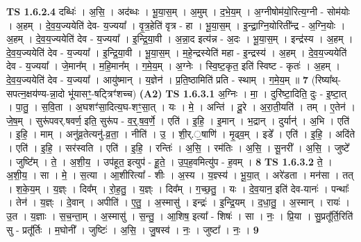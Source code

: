 \documentclass[17pt]{extarticle}
\begin{document}
                  \newline
                                \textbf{ TS 1.6.2.4} \newline
                  दब्धिः॑ । अ॒सि॒ । अद॑ब्धः । भू॒या॒स॒म् । अ॒मुम् । द॒भे॒य॒म् । अ॒ग्नीषोम॑यो॒रित्य॒ग्नी - सोम॑योः । अ॒हम् । दे॒व॒य॒ज्ययेति॑ देव- य॒ज्यया᳚ । वृ॒त्र॒हेति॑ वृत्र - हा । भू॒या॒स॒म् । इ॒न्द्रा॒ग्नि॒योरिती᳚न्द्र - अ॒ग्नि॒योः । अ॒हम् । दे॒व॒य॒ज्ययेति॑ देव - य॒ज्यया᳚ । इ॒न्द्रि॒या॒वी । अ॒न्ना॒द इत्य॑न्न - अ॒दः । भू॒या॒स॒म् । इन्द्र॑स्य । अ॒हम् । दे॒व॒य॒ज्ययेति॑ देव - य॒ज्यया᳚ । इ॒न्द्रि॒या॒वी । भू॒या॒स॒म् । म॒हे॒न्द्रस्येति॑ महा - इ॒न्द्रस्य॑ । अ॒हम् । दे॒व॒य॒ज्ययेति॑ देव - य॒ज्यया᳚ । जे॒मान᳚म् । म॒हि॒मान᳚म् । ग॒मे॒य॒म् । अ॒ग्नेः । स्वि॒ष्ट॒कृत॒ इति॑ स्विष्ट - कृतः॑ । अ॒हम् । दे॒व॒य॒ज्ययेति॑ देव - य॒ज्यया᳚ । आयु॑ष्मान् । य॒ज्ञेन॑ । प्र॒ति॒ष्ठामिति॑ प्रति - स्थाम् । ग॒मे॒य॒म् ॥ \textbf{  7 } \newline
                  \newline
                      (रिष्या᳚थ्-सपत्न॒क्षय॑ण्य-न्ना॒दो भू॑यासꣳ॒॒-षट्त्रिꣳ॑शच्च)  \textbf{(A2)} \newline \newline
                                \textbf{ TS 1.6.3.1} \newline
                  अ॒ग्निः । मा॒ । दुरि॑ष्टा॒दिति॒ दुः - इ॒ष्टा॒त् । पा॒तु॒ । स॒वि॒ता । अ॒घशꣳ॑सा॒दित्य॒घ-शꣳ॒॒सा॒त् । यः । मे॒ । अन्ति॑ । दू॒रे । अ॒रा॒ती॒यति॑ । तम् । ए॒तेन॑ । जे॒ष॒म् । सुरू॑पवर्.षवर्ण॒ इति॒ सुरू॑प - व॒र्॒.ष॒व॒र्णे॒ । एति॑ । इ॒हि॒ । इ॒मान् । भ॒द्रान् । दुर्यान्॑ । अ॒भि । एति॑ । इ॒हि॒ । माम् । अनु॑व्र॒तेत्यनु॑-व्र॒ता॒ । नीति॑ । उ॒ । शी॒र्.॒षाणि॑ । मृ॒ढ्व॒म् । इडे᳚ । एति॑ । इ॒हि॒ । अदि॑ते । एति॑ । इ॒हि॒ । सर॑स्वति । एति॑ । इ॒हि॒ । रन्तिः॑ । अ॒सि॒ । रम॑तिः । अ॒सि॒ । सू॒नरी᳚ । अ॒सि॒ । जुष्टे᳚ । जुष्टि᳚म् । ते॒ । अ॒शी॒य॒ । उप॑हूत॒ इत्युप॑ - हू॒ते॒ । उ॒प॒ह॒वमित्यु॑प - ह॒वम् । \textbf{  8} \newline
                  \newline
                                \textbf{ TS 1.6.3.2} \newline
                  ते॒ । अ॒शी॒य॒ । सा । मे॒ । स॒त्या । आ॒शीरित्या᳚ - शीः । अ॒स्य । य॒ज्ञ्स्य॑ । भू॒या॒त् । अरे॑डता । मन॑सा । तत् । श॒के॒य॒म् । य॒ज्ञ्ः । दिव᳚म् । रो॒ह॒तु॒ । य॒ज्ञ्ः । दिव᳚म् । ग॒च्छ॒तु॒ । यः । दे॒व॒यान॒ इति॑ देव-यानः॑ । पन्थाः᳚ । तेन॑ । य॒ज्ञ्ः । दे॒वान् । अपीति॑ । ए॒तु॒ । अ॒स्मासु॑ । इन्द्रः॑ । इ॒न्द्रि॒यम् । द॒धा॒तु॒ । अ॒स्मान् । रायः॑ । उ॒त । य॒ज्ञाः । स॒च॒न्ता॒म् । अ॒स्मासु॑ । स॒न्तु॒ । आ॒शिष॒ इत्या᳚ - शिषः॑ । सा । नः॒ । प्रि॒या । सु॒प्रतू᳚र्ति॒रिति॑ सु - प्रतू᳚र्तिः । म॒घोनी᳚ । जुष्टिः॑ । अ॒सि॒ । जु॒षस्व॑ । नः॒ । जुष्टा᳚ । नः॒ । \textbf{  9} \newline
\end{document}
